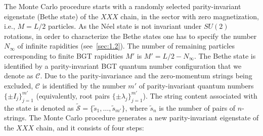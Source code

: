 \documentclass[11pt]{iopart}
\begin{document}
The Monte Carlo procedure starts with a randomly selected parity-invariant eigenstate 
(Bethe state) of the $XXX$ chain, in the sector with zero magnetization, i.e., $M=L/2$ 
particles. As the N\'eel state is not invariant under $SU(2)$ rotations, in order to 
characterize the Bethe states one has to specify the number $N_{\infty}$ of infinite 
rapidities (see~\ref{sec:1.2}). The number of remaining particles corresponding to finite 
BGT rapidities $M'$ is $M'=L/2-N_\infty$. The Bethe state is identified by a parity-invariant 
BGT quantum number configuration that we denote as ${\mathcal C}$. Due to the parity-invariance 
and the zero-momentum strings being excluded, ${\mathcal C}$ is identified by the 
number $m'$ of parity-invariant quantum numbers $\{\pm I_j\}_{j=1}^{m'}$ (equivalently, 
root pairs $\{\pm\lambda_j\}_{j=1}^{m'}$). The string 
content associated with the state is denoted as $\widetilde{\mathcal S}=\{\tilde s_1,
\dots,\tilde s_{m'}\}$, where $\tilde s_n$ is the number of pairs of $n$-strings. The 
Monte Carlo procedure generates a new parity-invariant eigenstate of the $XXX$ chain, 
and it consists of four steps: 
%
\end{document}
